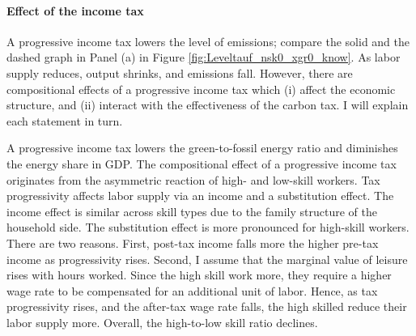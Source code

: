 \paragraph{Effect of the income tax}

 A progressive income tax lowers the level of emissions; compare the solid and the dashed graph in Panel (a) in Figure \ref{fig:Leveltauf_nsk0_xgr0_know}. As labor supply reduces, output shrinks, and emissions fall. 
 However, there are compositional effects of a progressive income tax which (i) affect the economic structure, and (ii) interact with the effectiveness of the carbon tax. I will explain each statement in turn. 
 
 A progressive income tax lowers the green-to-fossil energy ratio and diminishes the energy share in GDP. %
 The compositional effect of a progressive income tax originates from the asymmetric reaction of high- and low-skill workers. 
  Tax progressivity affects labor supply via an income and a substitution effect. 
 The income effect is similar across skill types due to the family structure of the household side.
 The substitution effect is more pronounced for high-skill workers.
 There are two reasons. First, post-tax income falls more the higher pre-tax income as progressivity rises. 
 Second,  I assume that the marginal value of leisure rises with hours worked. Since the high skill work more, they require a higher wage rate to be compensated for an additional unit of labor. Hence, as tax progressivity rises, and the after-tax wage rate falls, the high skilled reduce their labor supply more.  %
 Overall, the high-to-low skill ratio declines. 
 

